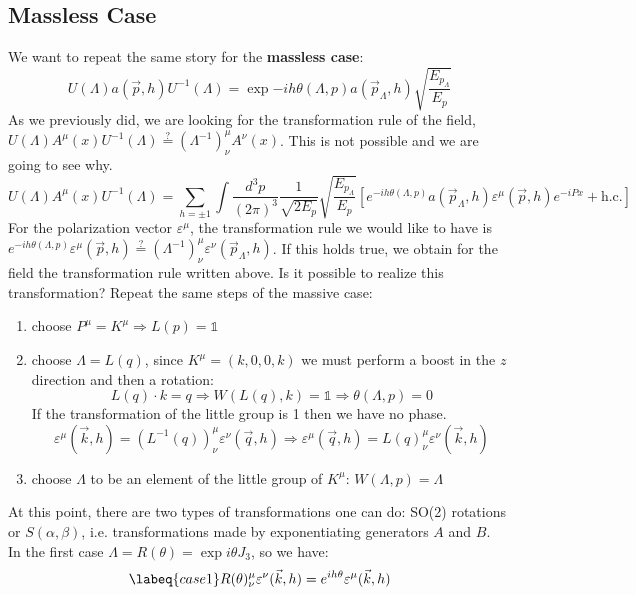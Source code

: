 \documentclass[../main.tex]{subfiles}
\begin{document}
\subsection{Massless Case}
We want to repeat the same story for the \textbf{massless case}:
\[
U(\Lambda)a(\vec{p},h)U^{-1}(\Lambda)=\exp{-ih\theta(\Lambda,p)}a(\vec{p}_\Lambda,h)\sqrt{\frac{E_{p_\Lambda}}{E_p}}
\]
As we previously did, we are looking for the transformation rule of the field, $U(\Lambda)A^\mu(x)U^{-1}(\Lambda)\stackrel{?}{=}(\Lambda^{-1})^\mu_\nu A^\nu(x)$. This is not possible and we are going to see why.
\[
U(\Lambda)A^\mu(x)U^{-1}(\Lambda)=\sum_{h=\pm1}\int\frac{d^3p}{(2\pi)^3}\frac{1}{\sqrt{2E_p}}\sqrt{\frac{E_{p_\Lambda}}{E_p}}\left[e^{-ih\theta(\Lambda,p)}a(\vec{p}_\Lambda,h)\varepsilon^\mu(\vec{p},h)e^{-iPx}+\text{h.c.}\right]
\]
For the polarization vector $\varepsilon^\mu$, the transformation rule we would like to have is $e^{-ih\theta(\Lambda,p)}\varepsilon^\mu(\vec{p},h)\stackrel{?}{=}(\Lambda^{-1})^\mu_\nu\varepsilon^\nu(\vec{p}_\Lambda,h)$. If this holds true, we obtain for the field the transformation rule written above. Is it possible to realize this transformation? Repeat the same steps of the massive case:
\begin{enumerate}
    \item choose $P^\mu=K^\mu\Rightarrow L(p)=\mathbb{1}$
    \item choose $\Lambda=L(q)$, since $K^\mu=(k,0,0,k)$ we must perform a boost in the $z$ direction and then a rotation:
    \[
    L(q)\cdot k=q\Rightarrow W(L(q),k)=\mathbb{1}\Rightarrow\theta(\Lambda,p)=0
    \]
    If the transformation of the little group is 1 then we have no phase.
    \[
    \varepsilon^\mu(\vec{k},h)=(L^{-1}(q))^\mu_\nu\varepsilon^\nu(\vec{q},h)\Rightarrow\varepsilon^\mu(\vec{q},h)=L(q)^\mu_\nu\varepsilon^\nu(\vec{k},h)
    \]
    \item choose $\Lambda$ to be an element of the little group of $K^\mu$: $W(\Lambda,p)=\Lambda$
\end{enumerate}
At this point, there are two types of transformations one can do: SO(2) rotations or $S(\alpha,\beta)$, i.e. transformations made by exponentiating generators $A$ and $B$.\\
In the first case $\Lambda=R(\theta)=\exp{i\theta J_3}$, so we have:
\begin{equation}
\labeq{case1}
R(\theta)^\mu_\nu\varepsilon^\nu(\vec{k},h)=e^{ih\theta}\varepsilon^\mu(\vec{k},h)
\end{equation}
\end{document}
